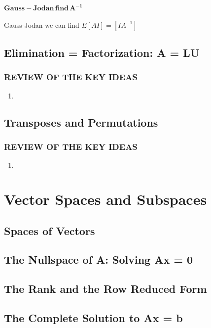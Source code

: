 \documentclass{book}
\begin{document}
    \subsubsection{\( \mathbf{Gauss-Jodan\, find\, A^{-1}}\)}
    Gauss-Jodan we can find \( E [AI] = [I A^{-1}]\)

\section{Elimination = Factorization: A = LU}
    \subsection*{REVIEW OF THE KEY IDEAS}
        \begin{enumerate}
            \item  
        \end{enumerate}

\section{Transposes and Permutations}
    \subsection*{REVIEW OF THE KEY IDEAS}
        \begin{enumerate}
            \item  
        \end{enumerate}


\chapter{Vector Spaces and Subspaces}
\section{Spaces of Vectors}

\section{The Nullspace of A: Solving Ax = 0}

\section{The Rank and the Row Reduced Form}

\section{The Complete Solution to Ax = b}
\end{document}
